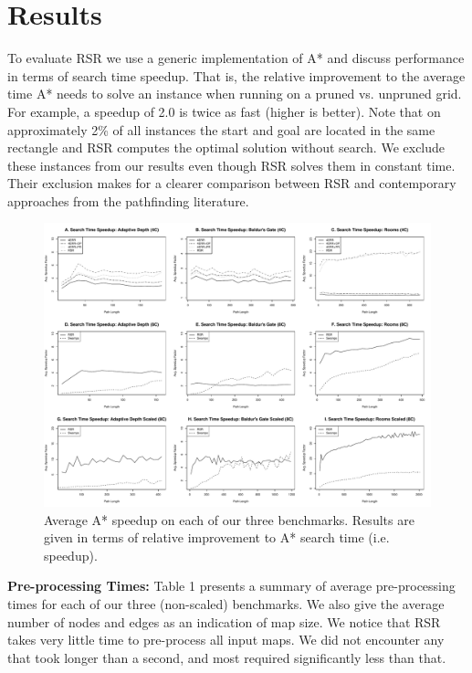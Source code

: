 \section{Results}
\label{cha::rsr::results}
To evaluate RSR we use a generic implementation of A* and discuss performance 
in terms of search time speedup. That is, the relative improvement to the average 
time A* needs to solve an instance when running on a pruned  vs. unpruned grid.
For example, a speedup of 2.0 is twice as fast (higher is better).
Note that on approximately 2\% of all instances the start and goal are located
in the same rectangle and RSR computes the optimal solution without
search.  We exclude these instances from our results even though RSR solves
them in constant time. Their exclusion makes for a clearer comparison between
RSR and contemporary approaches from the pathfinding literature.

\par 
\begin{figure}[t]
\begin{center}
   \includegraphics[width=0.97\columnwidth, trim = 10mm 10mm 10mm 0mm]{chapter_rsr/diagrams/speedup.pdf}
\end{center}
\caption[Search time speedup: RSR]
{\small 
Average A* speedup on each of our three benchmarks. 
Results are given in terms of relative improvement to A* search time (i.e. speedup).}
\label{fig::rsr::speedup}
\end{figure}


\textbf{Pre-processing Times: } 
Table 1 presents a summary of average pre-processing times for
each of our three (non-scaled) benchmarks. We also give the average number of
nodes and edges as an indication of map size.
We notice that RSR takes very little time to pre-process all input maps. 
We did not encounter any that took longer than a second, and most required 
significantly less than that. 

